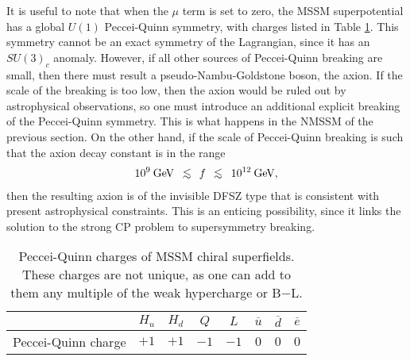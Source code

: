 \documentclass[12pt]{article}
\def\beq{\begin{eqnarray}}
\def\eeq{\end{eqnarray}}
\def\centeron#1#2{{\setbox0=\hbox{#1}\setbox1=\hbox{#2}\ifdim
\wd1>\wd0\kern.5\wd1\kern-.5\wd0\fi
\copy0\kern-.5\wd0\kern-.5\wd1\copy1\ifdim\wd0>\wd1
\kern.5\wd0\kern-.5\wd1\fi}}
\def\ltap{\;\centeron{\raise.35ex\hbox{$<$}}{\lower.65ex\hbox{$\sim$}}\;}
\def\lsim{\mathrel{\ltap}}
\begin{document}
It is useful to note that when the $\mu$ term is set to zero,
the MSSM superpotential 
has a global $U(1)$ Peccei-Quinn symmetry, with charges listed in Table 
\ref{table:PecceiQuinn}. 
This symmetry cannot be an exact symmetry of the Lagrangian, since it has
an $SU(3)_c$ anomaly. However, if all other sources of Peccei-Quinn breaking
are small, then there must result a pseudo-Nambu-Goldstone boson, the axion.
If the scale of the breaking is too low, then the axion would be ruled
out by astrophysical observations, so one must introduce an additional
explicit breaking of the Peccei-Quinn symmetry. This is what happens in the
NMSSM of the previous section. 
On the other hand, if the scale of Peccei-Quinn breaking is
such that the axion decay constant
is in the range
\beq
10^{9}\>\mbox{GeV} \> \lsim \,f\, \lsim\> 10^{12}\>\mbox{GeV},
\label{eq:axionfrange}
\eeq
then the resulting axion is of the invisible DFSZ type \cite{DFSZ}
that is consistent with present astrophysical constraints. This is an
enticing possibility, since it links the solution to the strong CP problem to
supersymmetry breaking. 
\renewcommand{\arraystretch}{1.4}
\begin{table}[tb]
\begin{center}
%
\begin{tabular}{|c|c|c|c|c|c|c|c|}
\hline
& $H_u$ & $H_d$ & $Q$ & $L$ & $\overline u$ & $\overline d$ &
$\overline e$ \\
\hline Peccei-Quinn charge & $+1$ & $+1$ & $-1$ & $-1$ & $0$ & $0$ &
$0$ \\ \hline
\end{tabular}
%
\caption{Peccei-Quinn charges of MSSM chiral superfields.
These charges are not unique,
as one can add to them any multiple of the weak hypercharge or 
B$-$L.\label{table:PecceiQuinn}} 
\end{center}
\end{table}
\end{document}
